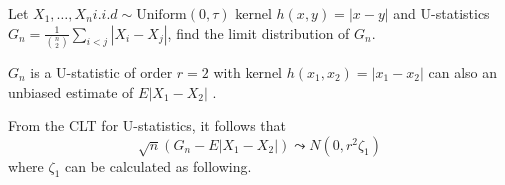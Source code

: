 \begin{problem}
    Let $X_1,\ldots,X_n i.i.d \sim \text{Uniform}(0,\tau)$ kernel $h(x,y)=|x-y|$ and U-statistics $G_n=\frac{1}{{n\choose 2}}\sum_{i<j}|X_i-X_j|$, find the limit distribution of $G_n$.
\end{problem}

\begin{solution}
    $G_n$ is a U-statistic of order $r=2$ with kernel $h(x_1,x_2)=|x_1-x_2|$ can also an unbiased estimate of $E|X_1 - X_2|$ \citep{Dasgupta2008Asymptotic}.

    From the CLT for U-statistics, it follows that
    \begin{equation*}
        \sqrt{n}(G_n -E|X_1 - X_2|) \leadsto N(0, r^2 \zeta_1) 
    \end{equation*}
    where $\zeta_1$ can be calculated as following. %


\end{solution}
